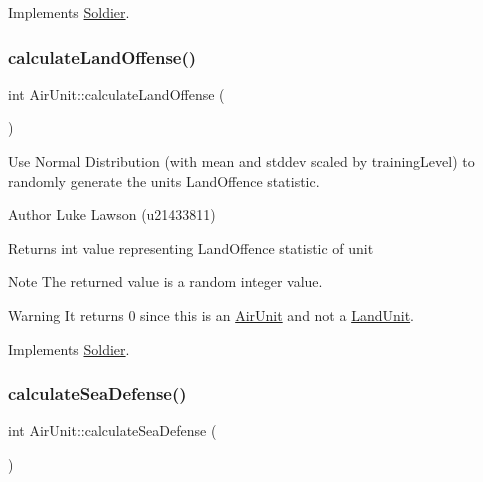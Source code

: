Implements \mbox{\hyperlink{class_soldier_ab37165b4ce8fbe4a24a759c81ece58c4}{Soldier}}.

\mbox{\label{class_air_unit_ab5f13baf31eafe62bf482ec4501f4975}} 
\subsubsection{\texorpdfstring{calculateLandOffense()}{calculateLandOffense()}}
{\footnotesize\ttfamily int Air\+Unit\+::calculate\+Land\+Offense (\begin{DoxyParamCaption}{ }\end{DoxyParamCaption})\hspace{0.3cm}{\ttfamily [virtual]}}



Use Normal Distribution (with mean and stddev scaled by training\+Level) to randomly generate the unit\textquotesingle{}s Land\+Offence statistic. 

\begin{DoxyAuthor}{Author}
Luke Lawson (u21433811) 
\end{DoxyAuthor}
\begin{DoxyReturn}{Returns}
int value representing Land\+Offence statistic of unit 
\end{DoxyReturn}
\begin{DoxyNote}{Note}
The returned value is a random integer value. 
\end{DoxyNote}
\begin{DoxyWarning}{Warning}
It returns 0 since this is an \mbox{\hyperlink{class_air_unit}{Air\+Unit}} and not a \mbox{\hyperlink{class_land_unit}{Land\+Unit}}. 
\end{DoxyWarning}


Implements \mbox{\hyperlink{class_soldier_ac0add7efb3192adb809bc1746c880fc0}{Soldier}}.

\mbox{\label{class_air_unit_ab7cd17470efa06d53df2ad5be3964e7a}} 
\subsubsection{\texorpdfstring{calculateSeaDefense()}{calculateSeaDefense()}}
{\footnotesize\ttfamily int Air\+Unit\+::calculate\+Sea\+Defense (\begin{DoxyParamCaption}{ }\end{DoxyParamCaption})\hspace{0.3cm}{\ttfamily [virtual]}}



